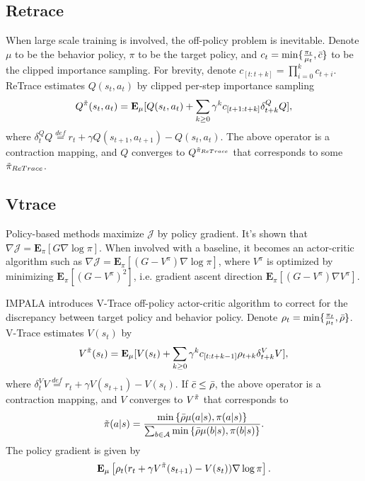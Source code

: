 \documentclass[nohyperref]{article}
\theoremstyle{plain}
\begin{document}
\subsection{Retrace}

When large scale training is involved, the off-policy problem is inevitable.
Denote $\mu$ to be the behavior policy, $\pi$ to be the target policy, and $c_t = \min\{\frac{\pi_t}{\mu_t}, \Bar{c}\}$ to be the clipped importance sampling. 
For brevity, denote $c_{[t: t+k]} = \prod_{i=0}^{k} c_{t+i}$. 
ReTrace \citep{retrace} estimates $Q(s_t, a_t)$ by clipped per-step importance sampling
\begin{equation*}
\label{Equ: retrace}
    Q^{\Tilde{\pi}} (s_t, a_t) 
= \textbf{E}_{\mu} [ Q(s_t, a_t) + \sum_{k \geq 0} \gamma^k 
c_{[t+1:t+k]} \delta^{Q}_{t+k} Q ],
\end{equation*}
where $\delta^{Q}_t Q \overset{def}{=} r_t + \gamma Q(s_{t+1}, a_{t+1}) - Q(s_t, a_t)$. 
The above operator is a contraction mapping, 
and $Q$ converges to $Q^{\Tilde{\pi}_{ReTrace}}$ that corresponds to some $\Tilde{\pi}_{ReTrace}$.


\subsection{Vtrace}
Policy-based methods maximize $\mathcal{J}$ by policy gradient. 
It's shown \citep{sutton} that $\nabla \mathcal{J} = \textbf{E}_\pi [G \nabla \log \pi]$. 
When involved with a baseline, it becomes an actor-critic algorithm such as $\nabla \mathcal{J} = \textbf{E}_\pi [(G - V^\pi) \nabla \log \pi]$, where $V^\pi$ is optimized by minimizing $\textbf{E}_\pi [(G - V^\pi)^2]$, i.e. gradient ascent direction $\textbf{E}_\pi [(G - V^\pi)\nabla V^\pi]$.

IMPALA \citep{impala} introduces V-Trace off-policy actor-critic algorithm to correct for the discrepancy between target policy and behavior policy. Denote $\rho_t = \min\{\frac{\pi_t}{\mu_t}, \Bar{\rho} \}$. V-Trace estimates $V(s_t)$ by
\begin{equation*}
\label{Equ: vtrace}
    V^{\Tilde{\pi}} (s_t) 
        = \textbf{E}_{\mu} [ 
        V(s_t) + \sum_{k \geq 0} \gamma^k 
     c_{[t:t+k-1]} \rho_{t+k}  \delta^{V}_{t+k} V ],
\end{equation*}
where $\delta^{V}_t V \overset{def}{=} r_t + \gamma V(s_{t+1}) - V(s_t)$. 
If $\Bar{c} \leq \Bar{\rho}$, the above operator is a contraction mapping, and $V$ converges to $V^{\Tilde{\pi}}$ that corresponds to 
$$
        \Tilde{\pi}(a|s) = \frac
        {\min \left\{\Bar{\rho} \mu (a|s), \pi(a|s)\right\}}
        {\sum_{b \in \mathcal{A}}\min \left\{\Bar{\rho} \mu (b|s), \pi(b|s)\right\}}.
$$
The policy gradient is given by
$$
\textbf{E}_\mu \left[\rho_t (r_t + \gamma V^{\Tilde{\pi}}(s_{t+1}) - V(s_t)) \nabla \log \pi \right].
$$
\end{document}
